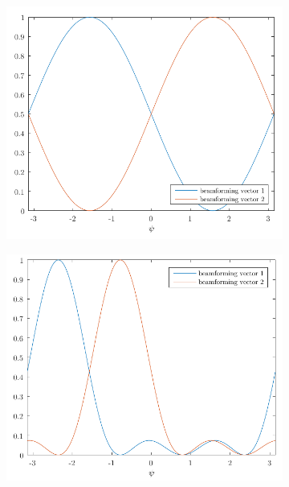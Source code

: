\begin{figure}[ht!]
\centering
\begin{subfigure}{0.49\linewidth}
    \centering
    \includegraphics[width=\linewidth]{figs/fig4.20}
    \caption{}
    \label{fig:4.20}
\end{subfigure}
\begin{subfigure}{0.49\linewidth}
    \centering
    \includegraphics[width=\linewidth]{figs/fig4.21}
    \caption{}
    \label{fig:4.21}
\end{subfigure}
\begin{subfigure}{0.49\linewidth}

\end{subfigure}
\end{figure}
